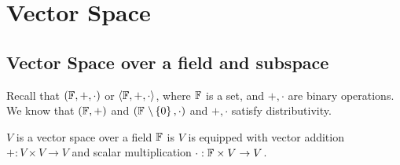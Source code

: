 \section{Vector Space}
\subsection{Vector Space over a field and subspace}
Recall that $(\mathbb F, + , \cdot)$ or $\langle \mathbb F, + , \cdot \rangle$, where $\mathbb F$ is a set, and $+ , \cdot $ are binary operations. \\
We know that $(\mathbb F, +)$ and $(\mathbb F \ \backslash \left\{ 0 \right\}, \cdot)$ and $+, \cdot $ satisfy distributivity.
\begin{definition}
$V$ is a vector space over a field $\mathbb F$ is $V$ is equipped with vector addition $+ : V \times V \to V$ and scalar multiplication $\cdot : \mathbb F \times V \to V$.
\end{definition}
